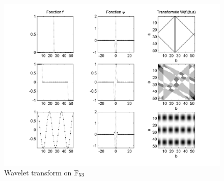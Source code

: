 \begin{exo}
\begin{figure}[ht]
    \begin{center}
    \includegraphics[scale=0.7]{images/ondelettes-corps-finis}
    \end{center}
    \caption{Wavelet transform on $ \mathbb{F}_{53} $}
              \label{wavelets-finite-body}
\end{figure}
\end{exo}
 

